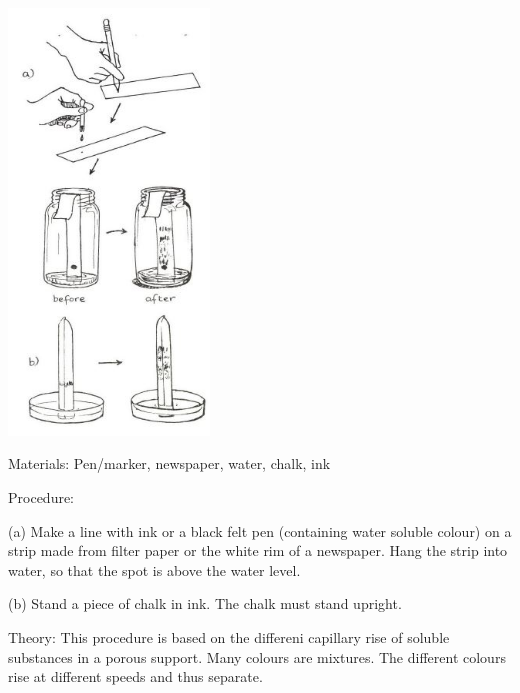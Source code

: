 \begin{multicols}{2}
\begin{center}
\includegraphics[width=0.4\textwidth]{./img/source/chromatography.jpg} 
\end{center}

\begin{description*}
\item[Materials:]{Pen/marker, newspaper, water, chalk, ink}
\item[Procedure:]{(a) Make a line with ink or a black felt pen (containing water soluble
colour) on a strip made from filter paper or the white rim of a newspaper. Hang the strip into
water, so that the spot is above the water level.

(b) Stand a piece of chalk in ink. The chalk must
stand upright.}
\item[Theory:]{This procedure is based on the differeni
capillary rise of soluble substances in a porous
support. Many colours are mixtures. The different
colours rise at different speeds and thus separate.}
\end{description*}



\end{multicols}

\pagebreak